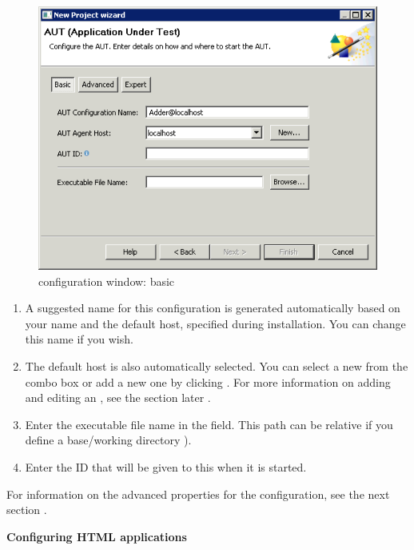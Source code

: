 \begin{figure}[h]
\begin{center}
\includegraphics{Tasks/AUTs/PS/autconfigwindow_basic}
\caption{\gdaut configuration window: basic}
\label{autconfigbasic}
\end{center}
\end{figure}

\begin{enumerate}
\item A suggested name for this \gdaut{} configuration is generated automatically based on your \gdaut{} name and the default \gdagent host, specified during installation. You can change this name if you wish. 
\item The default \gdagent host is also automatically selected. You can select a new \gdagent from the combo box or add a new one by clicking . For more information on adding and editing an \gdagent, see the  section later .

\item Enter the executable file name in the  field. This path can be relative if you define a base/working directory ).
\item Enter the \gdaut{} ID that will be given to this \gdaut{} when it is started.  
\end{enumerate}
For information on the advanced properties for the \gdaut{} configuration, see the next section . 

\textbf{Configuring HTML applications}\\

